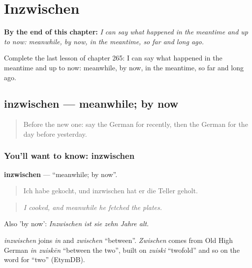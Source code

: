 
\chapter{Inzwischen}
\label{ch:ge-inzwischen}

\begin{chapteropening}
\textbf{By the end of this chapter:} \emph{I can say what happened in the meantime and up to now: meanwhile, by now, in the meantime, so far and long ago.}

Complete the last lesson of chapter 265: I can say what happened in the meantime and up to now: meanwhile, by now, in the meantime, so far and long ago.
\end{chapteropening}

\section[inzwischen]{inzwischen — meanwhile; by now}

\label{lesson:GE-C265-inzwischen}



\begin{quote}
Before the new one: say the German for recently, then the German for the day before yesterday.
\end{quote}

\subsection*{You'll want to know: inzwischen}
\textbf{inzwischen} — \textquotedblleft{}meanwhile; by now\textquotedblright{}.

\begin{quote}
Ich habe gekocht, und inzwischen hat er die Teller geholt.
\end{quote}

\begin{quote}
\emph{I cooked, and meanwhile he fetched the plates.}
\end{quote}

Also 'by now': \emph{Inzwischen ist sie zehn Jahre alt}.

\begin{cousinweb}
\emph{inzwischen} joins \emph{in} and \emph{zwischen} \textquotedblleft{}between\textquotedblright{}. \emph{Zwischen} comes from Old High German \emph{in zuiskēn} \textquotedblleft{}between the two\textquotedblright{}, built on \emph{zuiski} \textquotedblleft{}twofold\textquotedblright{} and so on the word for \textquotedblleft{}two\textquotedblright{} (EtymDB).
\end{cousinweb}

